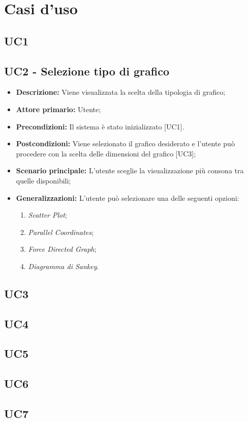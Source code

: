 \chapter{Casi d'uso}

\section{UC1}

\section{UC2 - Selezione tipo di grafico}
 \begin{itemize}
     \item \textbf{Descrizione:} Viene visualizzata la scelta della tipologia di grafico;
     \item \textbf{Attore primario:} Utente;
     \item \textbf{Precondizioni:} Il sistema è stato inizializzato [UC1].
     \item \textbf{Postcondizioni:} Viene selezionato il grafico desiderato e l'utente può procedere con la scelta delle dimensioni del grafico [UC3];
     \item \textbf{Scenario principale:} L'utente sceglie la visualizzazione più consona tra quelle disponibili;
     \item \textbf{Generalizzazioni:} L'utente può selezionare una delle seguenti opzioni:
     \begin{enumerate}
         \item \textit{Scatter Plot};
         \item \textit{Parallel Coordinates};
         \item \textit{Force Directed Graph};
         \item \textit{Diagramma di Sankey}.
     \end{enumerate}
 \end{itemize}
 
\section{UC3}

\section{UC4}

\section{UC5}

\section{UC6}

\section{UC7}
